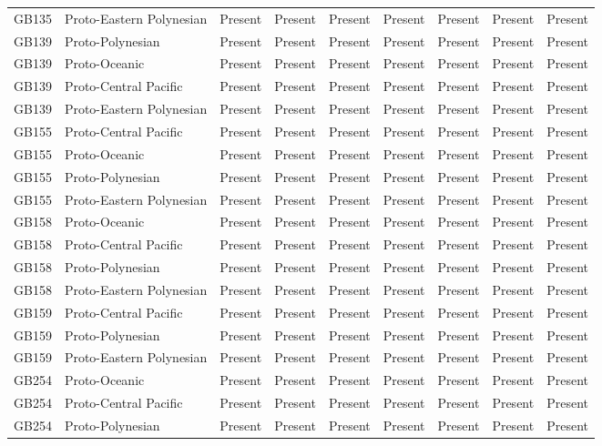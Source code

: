 \begin{longtable}{p{1.5cm}p{2.5cm}p{2.5cm}p{2.5cm}p{2.5cm}p{2.5cm}p{2.5cm}p{2.5cm}p{2.5cm}}
  GB135 & Proto-Eastern Polynesian & Present & Present & Present & Present & Present & Present & Present \\ 
  GB139 & Proto-Polynesian & Present & Present & Present & Present & Present & Present & Present \\ 
  GB139 & Proto-Oceanic & Present & Present & Present & Present & Present & Present & Present \\ 
  GB139 & Proto-Central Pacific & Present & Present & Present & Present & Present & Present & Present \\ 
  GB139 & Proto-Eastern Polynesian & Present & Present & Present & Present & Present & Present & Present \\ 
  GB155 & Proto-Central Pacific & Present & Present & Present & Present & Present & Present & Present \\ 
  GB155 & Proto-Oceanic & Present & Present & Present & Present & Present & Present & Present \\ 
  GB155 & Proto-Polynesian & Present & Present & Present & Present & Present & Present & Present \\ 
  GB155 & Proto-Eastern Polynesian & Present & Present & Present & Present & Present & Present & Present \\ 
  GB158 & Proto-Oceanic & Present & Present & Present & Present & Present & Present & Present \\ 
  GB158 & Proto-Central Pacific & Present & Present & Present & Present & Present & Present & Present \\ 
  GB158 & Proto-Polynesian & Present & Present & Present & Present & Present & Present & Present \\ 
  GB158 & Proto-Eastern Polynesian & Present & Present & Present & Present & Present & Present & Present \\ 
  GB159 & Proto-Central Pacific & Present & Present & Present & Present & Present & Present & Present \\ 
  GB159 & Proto-Polynesian & Present & Present & Present & Present & Present & Present & Present \\ 
  GB159 & Proto-Eastern Polynesian & Present & Present & Present & Present & Present & Present & Present \\ 
  GB254 & Proto-Oceanic & Present & Present & Present & Present & Present & Present & Present \\ 
  GB254 & Proto-Central Pacific & Present & Present & Present & Present & Present & Present & Present \\ 
  GB254 & Proto-Polynesian & Present & Present & Present & Present & Present & Present & Present \\ 

\end{longtable}
